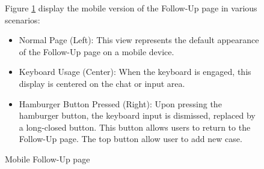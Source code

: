 \documentclass[12pt,oneside,openright,a4paper]{cpe-english-project}
\begin{document}
\begin{figure}[H]
\begin{minipage}{.15\textwidth}
      \end{minipage}
      \caption{Mobile Follow-Up page}\label{fig:Mob_Follow}
      \begin{justify}
        \qquad Figure \ref{fig:Mob_Follow} display the mobile version of the Follow-Up page in various scenarios:  \par
        \begin{itemize}
          \item Normal Page (Left): This view represents the default appearance of the Follow-Up page on a mobile device.
          \item Keyboard Usage (Center): When the keyboard is engaged, this display is centered on the chat or input area.
          \item Hamburger Button Pressed (Right): Upon pressing the hamburger button, the keyboard input is dismissed, replaced by a long-closed button. This button allows users to return to the Follow-Up page. The top button allow user to add new case.
        \end{itemize}
      \end{justify}
    \end{figure}
\end{document}
